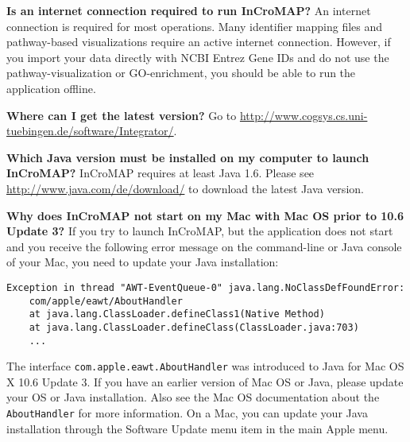 \noindent \textbf{Is an internet connection required to run InCroMAP?}\newline
An internet connection is required for most operations. Many identifier mapping files and pathway-based visualizations require an active internet connection. However, if you import your data directly with NCBI Entrez Gene IDs and do not use the pathway-visualization or GO-enrichment, you should be able to run the application offline.\newline

\noindent \textbf{Where can I get the latest version?}\newline
Go to \url{http://www.cogsys.cs.uni-tuebingen.de/software/Integrator/}.\newline

\noindent \textbf{Which Java version must be installed on my computer to launch InCroMAP?}\newline
InCroMAP requires at least Java 1.6. Please see \url{http://www.java.com/de/download/} to download the latest Java version.

\noindent \textbf{Why does InCroMAP not start on my Mac with Mac OS prior to 10.6 Update 3?}\newline
If you try to launch InCroMAP, but the application does not start and you receive the following error message on the command-line or Java console of your Mac, you need to update your Java installation:
\begin{verbatim}
Exception in thread "AWT-EventQueue-0" java.lang.NoClassDefFoundError:
    com/apple/eawt/AboutHandler
    at java.lang.ClassLoader.defineClass1(Native Method)
    at java.lang.ClassLoader.defineClass(ClassLoader.java:703)
    ...
\end{verbatim}
The interface \texttt{com.apple.eawt.AboutHandler} was introduced to Java for Mac OS X 10.6 Update 3. If you have an earlier version of Mac OS or Java, please update your OS or Java installation. Also see the Mac OS documentation about the \texttt{AboutHandler} for more information. On a Mac, you can update your Java installation through the Software Update menu item in the main Apple menu.\newline


